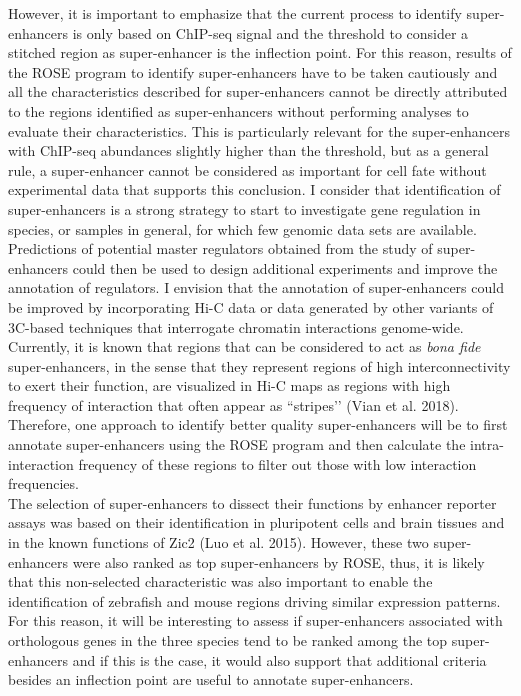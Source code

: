 However, it is important to emphasize that the current process to identify super-enhancers is only based on ChIP-seq signal and the threshold to consider a stitched region as super-enhancer is the inflection point. For this reason, results of the ROSE program to identify super-enhancers have to be taken cautiously and all the characteristics described for super-enhancers cannot be directly attributed to the regions identified as super-enhancers without performing analyses to evaluate their characteristics. This is particularly relevant for the super-enhancers with ChIP-seq abundances slightly higher than the threshold, but as a general rule, a super-enhancer cannot be considered as important for cell fate without experimental data that supports this conclusion. I consider that identification of super-enhancers is a strong strategy to start to investigate gene regulation in species, or samples in general, for which few genomic data sets are available. Predictions of potential master regulators obtained from the study of super-enhancers could then be used to design additional experiments and improve the annotation of regulators. I envision that the annotation of super-enhancers could be improved by incorporating Hi-C data or data generated by other variants of 3C-based techniques that interrogate chromatin interactions genome-wide. Currently, it is known that regions that can be considered to act as \textit{bona fide} super-enhancers, in the sense that they represent regions of high interconnectivity to exert their function, are visualized in Hi-C maps as regions with high frequency of interaction that often appear as ``stripes’’ (Vian et al. 2018). Therefore, one approach to identify better quality super-enhancers will be to first annotate super-enhancers using the ROSE program and then calculate the intra-interaction frequency of these regions to filter out those with low interaction frequencies.\\

The selection of super-enhancers to dissect their functions by enhancer reporter assays was based on their identification in pluripotent cells and brain tissues and in the known functions of Zic2 (Luo et al. 2015). However, these two super-enhancers were also ranked as top super-enhancers by ROSE, thus, it is likely that this non-selected characteristic was also important to enable the identification of zebrafish and mouse regions driving similar expression patterns. For this reason, it will be interesting to assess if super-enhancers associated with orthologous genes in the three species tend to be ranked among the top super-enhancers and if this is the case, it would also support that additional criteria besides an inflection point are useful to annotate super-enhancers.\\

